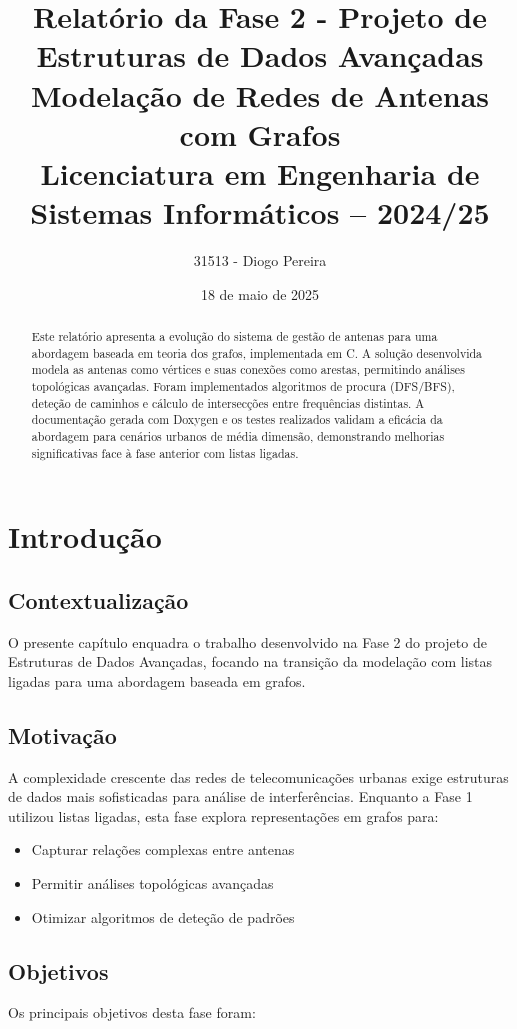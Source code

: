 \documentclass[a4paper,12pt]{report}
\title{%
  \textbf{Relatório da Fase 2 - Projeto de Estruturas de Dados Avançadas}\\[2em]
  \large Modelação de Redes de Antenas com Grafos\\[2em]
  Licenciatura em Engenharia de Sistemas Informáticos -- 2024/25
}
\author{31513 - Diogo Pereira}
\date{18 de maio de 2025}
\begin{document}
\maketitle

\begin{abstract}
Este relatório apresenta a evolução do sistema de gestão de antenas para uma abordagem baseada em teoria dos grafos, implementada em C. A solução desenvolvida modela as antenas como vértices e suas conexões como arestas, permitindo análises topológicas avançadas. Foram implementados algoritmos de procura (DFS/BFS), deteção de caminhos e cálculo de intersecções entre frequências distintas. A documentação gerada com Doxygen e os testes realizados validam a eficácia da abordagem para cenários urbanos de média dimensão, demonstrando melhorias significativas face à fase anterior com listas ligadas.
\end{abstract}

\tableofcontents

\chapter{Introdução}
\section{Contextualização}
O presente capítulo enquadra o trabalho desenvolvido na Fase 2 do projeto de Estruturas de Dados Avançadas, focando na transição da modelação com listas ligadas para uma abordagem baseada em grafos.

\section{Motivação}
A complexidade crescente das redes de telecomunicações urbanas exige estruturas de dados mais sofisticadas para análise de interferências. Enquanto a Fase 1 utilizou listas ligadas, esta fase explora representações em grafos para:

\begin{itemize}
    \item Capturar relações complexas entre antenas
    \item Permitir análises topológicas avançadas
    \item Otimizar algoritmos de deteção de padrões
\end{itemize}

\section{Objetivos}
Os principais objetivos desta fase foram:
\end{document}
